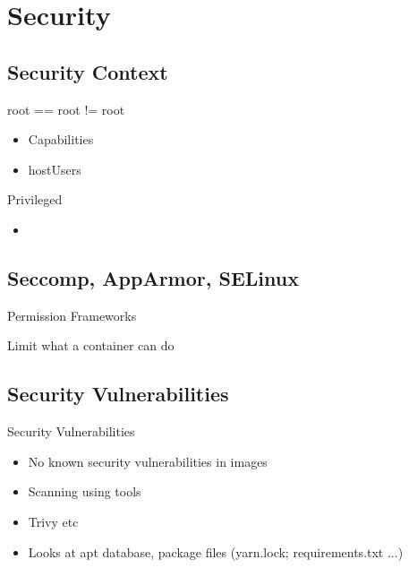 \documentclass{dcpresentation}
\begin{document}
\section{Security}

\subsection{Security Context}

\begin{frame}{root == root != root}
 \begin{itemize}
  \item Capabilities
  \item hostUsers
 \end{itemize}
\end{frame}

\begin{frame}{Privileged}
 \begin{itemize}
  \item 
 \end{itemize}
\end{frame}

\subsection{Seccomp, AppArmor, SELinux}

\begin{frame}{Permission Frameworks}
 \begin{frame}
  \item Limit what a container can do
 \end{frame}
\end{frame}

\subsection{Security Vulnerabilities}

\begin{frame}{Security Vulnerabilities}
 \begin{itemize}
  \item No known security vulnerabilities in images
  \item Scanning using tools
  \item Trivy etc
  \item Looks at apt database, package files (yarn.lock; requirements.txt ...)
 \end{itemize}  
\end{frame}
\end{document}

